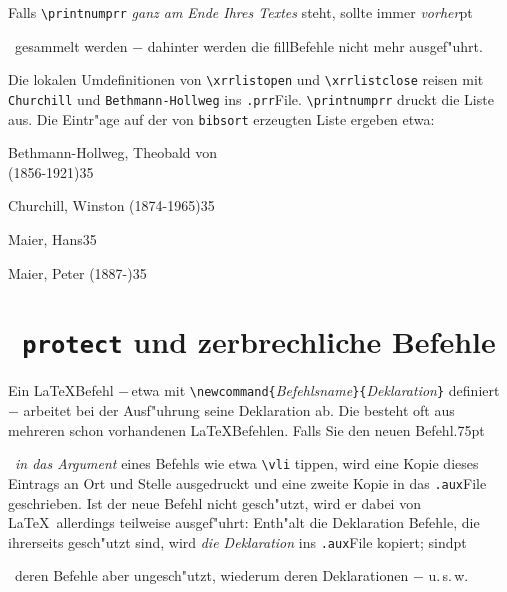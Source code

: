 \documentclass[12pt,a4paper]{article}
\newcommand{\pdfko}[1]{\kern #1pt
                          \strut\ignorespaces}%
\newcommand{\pbs}{\string\ \unskip}
\newcommand{\bs}{\protect\pbs}
\begin{document}
\vspace{.25ex}\noindent
Falls \verb|\printnumprr| \textit{ganz am Ende Ihres Textes} steht, sollte immer 
\textit{vorher}\pdfko{1}\
gesammelt werden $-$ dahinter werden die fill\hy Befehle nicht mehr ausgef"uhrt.

\vspace{1.5ex}\noindent
Die lokalen Umdefinitionen von \verb|\xrrlistopen| und
\verb|\xrrlistclose| reisen mit \verb|Churchill| und \verb|Bethmann-Hollweg|
ins \hspace{-.2em}\verb|.prr|\hy File. \verb|\printnumprr| druckt die Liste aus. 
Die Eintr"age auf der von \texttt{bibsort} erzeugten Liste ergeben etwa:

\vspace{-0.25ex}
\begin{description}\itemsep 0pt \parskip 0pt \lineskip 0pt \small
\item Bethmann-Hollweg, Theobald von \\ (1856-1921)\hspace{1.2em}\textsf{35}
\item Churchill, Winston (1874-1965)\hspace{1.2em}\textsf{35}
\item Maier, Hans\hspace{1.2em}\textsf{35}
\item Maier, Peter (1887-)\hspace{1.2em}\textsf{35}
\end{description}


\newpage
\section{\texttt{\bs protect} und zerbrechliche Befehle}\label{Sect9}\label{zerbrechen}

Ein \LaTeX\hy Befehl $-$\,etwa mit 
\verb|\newcommand{|\textit{Befehlsname}\verb|}{|\textit{Deklaration}\verb|}| 
definiert\,$-$ arbeitet bei der Ausf"uhrung seine Deklaration ab. Die
besteht oft aus mehreren schon vorhandenen \LaTeX\hy Befehlen. Falls
Sie den neuen Befehl\pdfko{.75}\ 
\textit{in das Argument} eines \BibArts\hy Befehls wie etwa
\verb|\vli| tippen, wird eine Kopie dieses Eintrags an Ort und Stelle
ausgedruckt und eine zweite Kopie in das \verb|.aux|\hy File geschrieben.
Ist der neue Befehl nicht gesch"utzt, wird er dabei von \LaTeX\ 
allerdings teilweise ausgef"uhrt: Enth"alt die Deklaration Befehle,
die ihrerseits gesch"utzt sind, wird \textit{die Deklaration} 
ins \verb|.aux|\hy File kopiert; sind\pdfko{1}\ deren Befehle aber ungesch"utzt, 
wiederum deren Deklarationen $-$ u.\,s.\,w.
\end{document}
